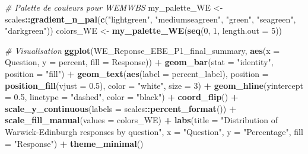 \documentclass[
]{article}
\newenvironment{Shaded}{\begin{snugshade}}{\end{snugshade}}
\newcommand{\AttributeTok}[1]{\textcolor[rgb]{0.13,0.29,0.53}{#1}}
\newcommand{\CommentTok}[1]{\textcolor[rgb]{0.56,0.35,0.01}{\textit{#1}}}
\newcommand{\DecValTok}[1]{\textcolor[rgb]{0.00,0.00,0.81}{#1}}
\newcommand{\FloatTok}[1]{\textcolor[rgb]{0.00,0.00,0.81}{#1}}
\newcommand{\FunctionTok}[1]{\textcolor[rgb]{0.13,0.29,0.53}{\textbf{#1}}}
\newcommand{\NormalTok}[1]{#1}
\newcommand{\OtherTok}[1]{\textcolor[rgb]{0.56,0.35,0.01}{#1}}
\newcommand{\SpecialCharTok}[1]{\textcolor[rgb]{0.81,0.36,0.00}{\textbf{#1}}}
\newcommand{\StringTok}[1]{\textcolor[rgb]{0.31,0.60,0.02}{#1}}
\begin{document}
\begin{Shaded}
\begin{Highlighting}[]
\CommentTok{\# Palette de couleurs pour WEMWBS}
\NormalTok{my\_palette\_WE }\OtherTok{\textless{}{-}}\NormalTok{ scales}\SpecialCharTok{::}\FunctionTok{gradient\_n\_pal}\NormalTok{(}\FunctionTok{c}\NormalTok{(}\StringTok{"lightgreen"}\NormalTok{, }\StringTok{"mediumseagreen"}\NormalTok{, }\StringTok{"green"}\NormalTok{, }\StringTok{"seagreen"}\NormalTok{, }\StringTok{"darkgreen"}\NormalTok{))}
\NormalTok{colors\_WE }\OtherTok{\textless{}{-}} \FunctionTok{my\_palette\_WE}\NormalTok{(}\FunctionTok{seq}\NormalTok{(}\DecValTok{0}\NormalTok{, }\DecValTok{1}\NormalTok{, }\AttributeTok{length.out =} \DecValTok{5}\NormalTok{))}

\CommentTok{\# Visualisation}
\FunctionTok{ggplot}\NormalTok{(WE\_Reponse\_EBE\_P1\_final\_summary, }\FunctionTok{aes}\NormalTok{(}\AttributeTok{x =}\NormalTok{ Question, }\AttributeTok{y =}\NormalTok{ percent, }\AttributeTok{fill =}\NormalTok{ Response)) }\SpecialCharTok{+}
  \FunctionTok{geom\_bar}\NormalTok{(}\AttributeTok{stat =} \StringTok{"identity"}\NormalTok{, }\AttributeTok{position =} \StringTok{"fill"}\NormalTok{) }\SpecialCharTok{+}
  \FunctionTok{geom\_text}\NormalTok{(}\FunctionTok{aes}\NormalTok{(}\AttributeTok{label =}\NormalTok{ percent\_label),}
            \AttributeTok{position =} \FunctionTok{position\_fill}\NormalTok{(}\AttributeTok{vjust =} \FloatTok{0.5}\NormalTok{),}
            \AttributeTok{color =} \StringTok{"white"}\NormalTok{,}
            \AttributeTok{size =} \DecValTok{3}\NormalTok{) }\SpecialCharTok{+}
  \FunctionTok{geom\_hline}\NormalTok{(}\AttributeTok{yintercept =} \FloatTok{0.5}\NormalTok{, }\AttributeTok{linetype =} \StringTok{"dashed"}\NormalTok{, }\AttributeTok{color =} \StringTok{"black"}\NormalTok{) }\SpecialCharTok{+}
  \FunctionTok{coord\_flip}\NormalTok{() }\SpecialCharTok{+}
  \FunctionTok{scale\_y\_continuous}\NormalTok{(}\AttributeTok{labels =}\NormalTok{ scales}\SpecialCharTok{::}\FunctionTok{percent\_format}\NormalTok{()) }\SpecialCharTok{+}
  \FunctionTok{scale\_fill\_manual}\NormalTok{(}\AttributeTok{values =}\NormalTok{ colors\_WE) }\SpecialCharTok{+}
  \FunctionTok{labs}\NormalTok{(}\AttributeTok{title =} \StringTok{"Distribution of Warwick{-}Edinburgh responses by question"}\NormalTok{,}
       \AttributeTok{x =} \StringTok{"Question"}\NormalTok{,}
       \AttributeTok{y =} \StringTok{"Percentage"}\NormalTok{,}
       \AttributeTok{fill =} \StringTok{"Response"}\NormalTok{) }\SpecialCharTok{+}
  \FunctionTok{theme\_minimal}\NormalTok{()}
\end{Highlighting}
\end{Shaded}
\end{document}
